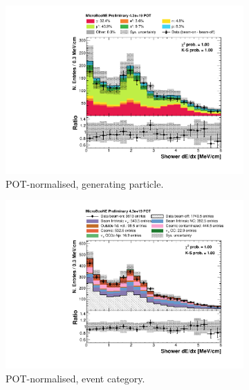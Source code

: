 \begin{figure}[htbp]
\centering
  \begin{subfigure}{0.49\textwidth}
    \includegraphics[width=\linewidth]{figures/h_shower_dedx_cali_pdg.pdf}
    \caption{POT-normalised, generating particle.} \label{fig:dedx_pdg}
  \end{subfigure}\hfill
  \begin{subfigure}{0.49\textwidth}
    \includegraphics[width=\linewidth]{figures/h_shower_dedx_cali.pdf}
    \caption{POT-normalised, event category.} \label{fig:dedx_pot}
  \end{subfigure}
  \begin{subfigure}{0.49\textwidth}

\end{subfigure}
\end{figure}
